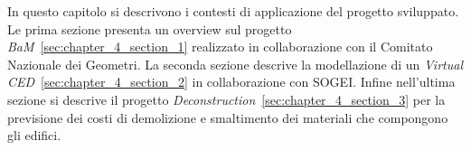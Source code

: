 In questo capitolo si descrivono i contesti di applicazione del progetto sviluppato.
Le prima sezione presenta un overview sul progetto \emph{BaM}~\ref{sec:chapter_4_section_1} realizzato
in collaborazione con il Comitato Nazionale dei Geometri.
La seconda sezione descrive la modellazione di un \emph{Virtual CED}~\ref{sec:chapter_4_section_2} in collaborazione con SOGEI.
Infine nell'ultima sezione si descrive il progetto \emph{Deconstruction}~\ref{sec:chapter_4_section_3} per la previsione dei
costi di demolizione e smaltimento dei materiali che compongono gli edifici.
